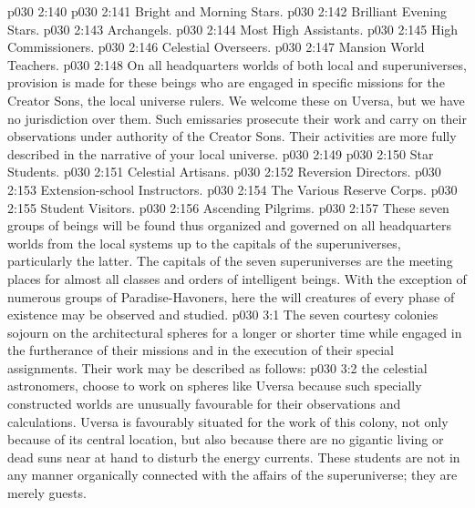 \vs p030 2:140 \bibnobreakspace {}
\vs p030 2:141 \bibnobreakspace Bright and Morning Stars.
\vs p030 2:142 \bibnobreakspace Brilliant Evening Stars.
\vs p030 2:143 \bibnobreakspace Archangels.
\vs p030 2:144 \bibnobreakspace Most High Assistants.
\vs p030 2:145 \bibnobreakspace High Commissioners.
\vs p030 2:146 \bibnobreakspace Celestial Overseers.
\vs p030 2:147 \bibnobreakspace Mansion World Teachers.
\vs p030 2:148 \pc On all headquarters worlds of both local and superuniverses, provision is made for these beings who are engaged in specific missions for the Creator Sons, the local universe rulers. We welcome these  on Uversa, but we have no jurisdiction over them. Such emissaries prosecute their work and carry on their observations under authority of the Creator Sons. Their activities are more fully described in the narrative of your local universe.
\vs p030 2:149 \bibnobreakspace {}
\vs p030 2:150 \bibnobreakspace Star Students.
\vs p030 2:151 \bibnobreakspace Celestial Artisans.
\vs p030 2:152 \bibnobreakspace Reversion Directors.
\vs p030 2:153 \bibnobreakspace Extension\hyp{}school Instructors.
\vs p030 2:154 \bibnobreakspace The Various Reserve Corps.
\vs p030 2:155 \bibnobreakspace Student Visitors.
\vs p030 2:156 \bibnobreakspace Ascending Pilgrims.
\vs p030 2:157 \pc These seven groups of beings will be found thus organized and governed on all headquarters worlds from the local systems up to the capitals of the superuniverses, particularly the latter. The capitals of the seven superuniverses are the meeting places for almost all classes and orders of intelligent beings. With the exception of numerous groups of Paradise\hyp{}Havoners, here the will creatures of every phase of existence may be observed and studied.
\vs p030 3:1 The seven courtesy colonies sojourn on the architectural spheres for a longer or shorter time while engaged in the furtherance of their missions and in the execution of their special assignments. Their work may be described as follows:
\vs p030 3:2 \bibnobreakspace {} the celestial astronomers, choose to work on spheres like Uversa because such specially constructed worlds are unusually favourable for their observations and calculations. Uversa is favourably situated for the work of this colony, not only because of its central location, but also because there are no gigantic living or dead suns near at hand to disturb the energy currents. These students are not in any manner organically connected with the affairs of the superuniverse; they are merely guests.
